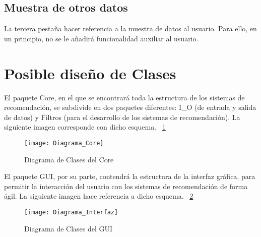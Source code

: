 \subsection{Muestra de otros datos}
La tercera pestaña hacer referencia  a la muestra de datos al usuario. Para ello, en un principio, no se le añadirá funcionalidad auxiliar al usuario.

\section{Posible diseño de Clases} 
El paquete Core,  en el que se encontrará toda la estructura de los sistemas de recomendación, se subdivide en dos paquetes diferentes: I\_O (de entrada y salida de datos) y Filtros (para el desarrollo de los sistemas de recomendación). La siguiente imagen corresponde con dicho esquema. 
 ~\ref{fig:C.3.5}
\begin{figure}[h]
\centering
\texttt{[image: Diagrama\_Core]}
\caption{Diagrama de Clases del Core}
\label{fig:C.3.5}
\end{figure}
El paquete GUI, por su parte, contendrá la estructura de la interfaz gráfica, para permitir la interacción del usuario con los sistemas de recomendación de forma ágil. La siguiente imagen hace referencia a dicho esquema.  ~\ref{fig:C.3.6}
\begin{figure}[h]
\centering
\texttt{[image: Diagrama\_Interfaz]}
\caption{Diagrama de Clases del GUI}
\label{fig:C.3.6}
\end{figure}
